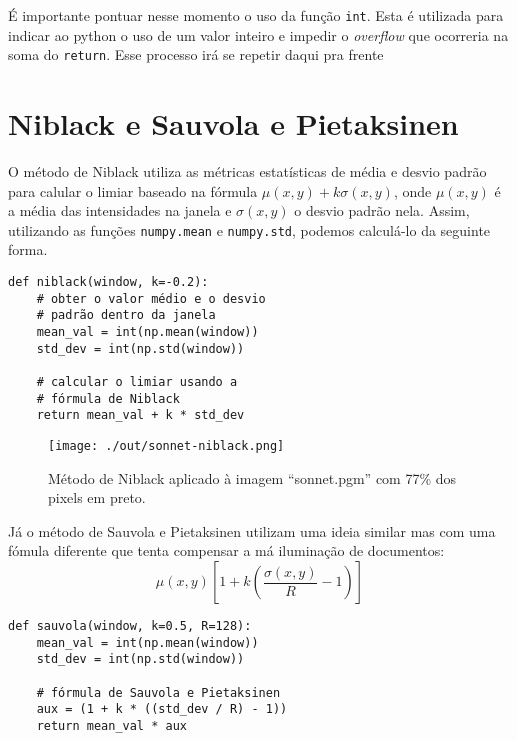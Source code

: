 \documentclass[twocolumn, 10pt]{article}
\begin{document}
É importante pontuar nesse momento o uso da função \texttt{int}.
Esta é utilizada para indicar ao python o uso de um valor inteiro e impedir o \emph{overflow} que ocorreria na soma do \texttt{return}.
Esse processo irá se repetir daqui pra frente

\section*{Niblack e Sauvola e Pietaksinen}
\label{sec:org0614476}
O método de Niblack utiliza as métricas estatísticas de média e desvio padrão para calular o limiar baseado na fórmula \(\mu(x,y) + k \sigma(x,y)\), onde \(\mu(x,y)\) é a média das intensidades na janela e \(\sigma(x,y)\) o desvio padrão nela.
Assim, utilizando as funções \texttt{numpy.mean} e \texttt{numpy.std}, podemos calculá-lo da seguinte forma.
\begin{verbatim}
def niblack(window, k=-0.2):
    # obter o valor médio e o desvio
    # padrão dentro da janela
    mean_val = int(np.mean(window))
    std_dev = int(np.std(window))

    # calcular o limiar usando a
    # fórmula de Niblack
    return mean_val + k * std_dev
\end{verbatim}
\begin{figure}[htbp]
\centering
\texttt{[image: ./out/sonnet-niblack.png]}
\caption{Método de Niblack aplicado à imagem ``sonnet.pgm'' com 77\% dos pixels em preto.}
\end{figure}

Já o método de Sauvola e Pietaksinen utilizam uma ideia similar mas com uma fómula diferente que tenta compensar a má iluminação de documentos:
\[\mu(x, y)\left[1+k\left(\frac{\sigma(x, y)}{R}-1\right)\right] \]
\begin{verbatim}
def sauvola(window, k=0.5, R=128):
    mean_val = int(np.mean(window))
    std_dev = int(np.std(window))

    # fórmula de Sauvola e Pietaksinen
    aux = (1 + k * ((std_dev / R) - 1))
    return mean_val * aux
\end{verbatim}
\end{document}
